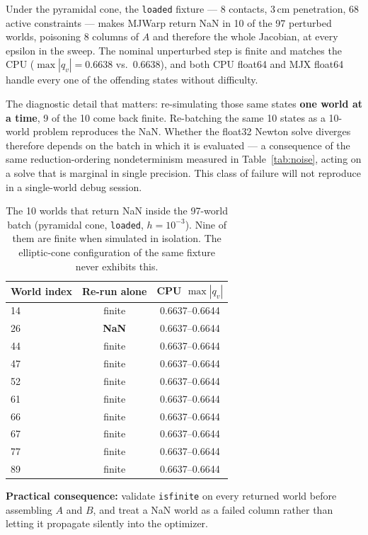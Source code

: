 \documentclass[11pt,a4paper]{article}
\newcommand{\code}[1]{\texttt{\small #1}}
\begin{document}
\label{sec:nan}

Under the pyramidal cone, the \code{loaded} fixture --- 8 contacts, 3\,cm
penetration, 68 active constraints --- makes MJWarp return NaN in 10 of the 97
perturbed worlds, poisoning 8 columns of $A$ and therefore the whole Jacobian, at every
epsilon in the sweep. The nominal unperturbed step is finite and matches the CPU
($\max|q_v| = 0.6638$ vs.\ $0.6638$), and both CPU float64 and MJX float64 handle every one
of the offending states without difficulty.

The diagnostic detail that matters: re-simulating those same states \textbf{one world at a
time}, 9 of the 10 come back finite. Re-batching the same 10
states as a 10-world problem reproduces the NaN. Whether the float32 Newton solve diverges
therefore depends on the batch in which it is evaluated --- a consequence of the same
reduction-ordering nondeterminism measured in Table~\ref{tab:noise}, acting on a solve that
is marginal in single precision. This class of failure will not reproduce in a single-world
debug session.

\begin{table}[htbp]
\centering
\footnotesize
\caption{The 10 worlds that return NaN inside the 97-world batch (pyramidal cone, \code{loaded}, $h=10^{-3}$). Nine of them are finite when simulated in isolation. The elliptic-cone configuration of the same fixture never exhibits this.}
\label{tab:nan}
\begin{tabular}{lcc}
\toprule
\textbf{World index} & \textbf{Re-run alone} & \textbf{CPU} $\max|q_v|$ \\
\midrule
14 & finite & 0.6637--0.6644 \\
26 & \textbf{NaN} & 0.6637--0.6644 \\
44 & finite & 0.6637--0.6644 \\
47 & finite & 0.6637--0.6644 \\
52 & finite & 0.6637--0.6644 \\
61 & finite & 0.6637--0.6644 \\
66 & finite & 0.6637--0.6644 \\
67 & finite & 0.6637--0.6644 \\
77 & finite & 0.6637--0.6644 \\
89 & finite & 0.6637--0.6644 \\
\bottomrule
\end{tabular}
\end{table}

\textbf{Practical consequence:} validate \code{isfinite} on every returned world
before assembling $A$ and $B$, and treat a NaN world as a failed column rather than letting
it propagate silently into the optimizer.
\end{document}
